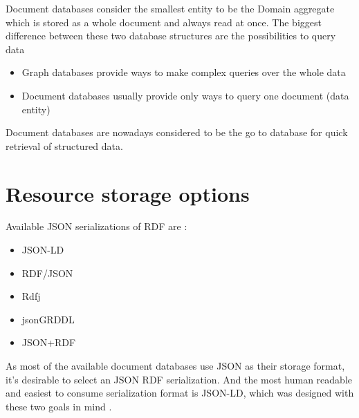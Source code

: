  Document databases consider the smallest entity to be the Domain aggregate which is stored as a whole document and always read at once. The biggest difference between these two database structures are the possibilities to query data 
\begin{itemize}
	\item Graph databases provide ways to make complex queries over the whole data
	\item Document databases usually provide only ways to query one document (data entity)
\end{itemize}
Document databases are nowadays considered to be the go to database for quick retrieval of structured  data.



\section{Resource storage options}
Available JSON serializations of RDF are \cite{onlineW3CRdfSyntax}:
\begin{itemize}
	\item JSON-LD
	\item RDF/JSON
	\item Rdfj
	\item jsonGRDDL
	\item JSON+RDF
\end{itemize}
As most of the available document databases use JSON as their storage format, it's desirable to select an JSON RDF serialization. And the most human readable and easiest to consume serialization format is JSON-LD, which was designed with these two goals in mind \cite{onlineJsonLdDesignGoals}. 

